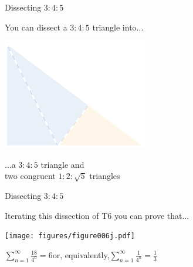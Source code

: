\documentclass[14pt]{beamer}
\begin{document}

    \begin{frame}{Dissecting $3\!\!:\!\!4\!\!:\!\!5$}
        \begin{center}
            You can dissect a $3\!\!:\!\!4\!\!:\!\!5$ triangle into...

            \bigskip \bigskip

            \includegraphics[height=18ex]{figures/figure006d.pdf}

            \bigskip \bigskip

            ...a $3\!\!:\!\!4\!\!:\!\!5$ triangle and\\two congruent $1\!\!:\!\!2\!\!:\!\!\sqrt{5}$ triangles
        \end{center}
    \end{frame}


    \begin{frame}{Dissecting $3\!\!:\!\!4\!\!:\!\!5$}
        \begin{center}
            Iterating this dissection of T6 you can prove that...

            \bigskip \bigskip

            \texttt{[image: figures/figure006j.pdf]}

            \bigskip \bigskip

            $\displaystyle\sum_{n=1}^\infty{\tfrac{18}{4^n}} = 6$\qquad or, equivalently,\qquad$\displaystyle\sum_{n=1}^\infty{\tfrac{1}{4^n}} = \tfrac{1}{3}$\\[2ex]
        \end{center}
    \end{frame}

\end{document}
